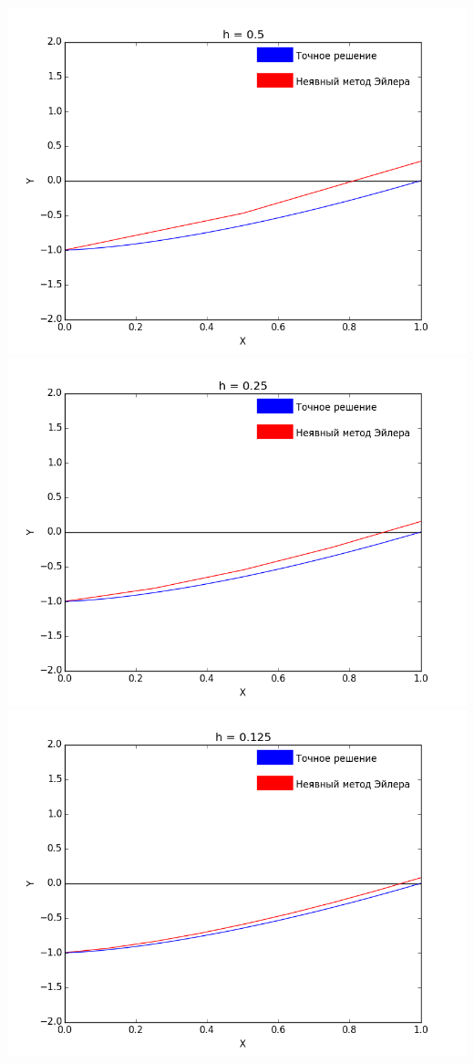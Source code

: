 \documentclass[12pt,a4paper]{article}
\begin{document}
		\noindent
        \includegraphics[scale=0.45]{implicitEulerGraph_Step=0_5}
        \includegraphics[scale=0.45]{implicitEulerGraph_Step=0_25}\\
        \includegraphics[scale=0.45]{implicitEulerGraph_Step=0_125}
\end{document}
